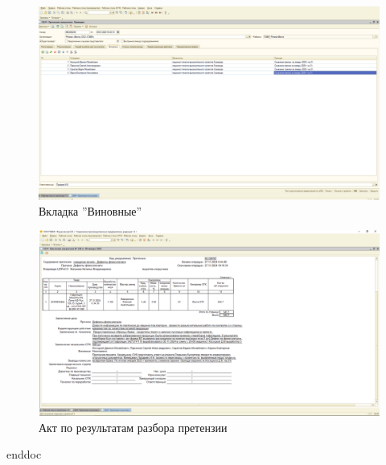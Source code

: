 \begin{figure}
\begin{center}
 \includegraphics[height=0.35\textheight, keepaspectratio]{Pics/VIIIпретензии6.png}
\end{center}
 \caption{Вкладка ''Виновные''}
 \label{pic:/VIIIпретензии6}
\end{figure}

\begin{figure}
\begin{center}
 \includegraphics[height=0.35\textheight, keepaspectratio]{Pics/VIIIпретензии5.png}
\end{center}
 \caption{Акт по результатам разбора претензии}
 \label{pic:/VIIIпретензии5}
\end{figure}


\clearpage
 {enddoc}